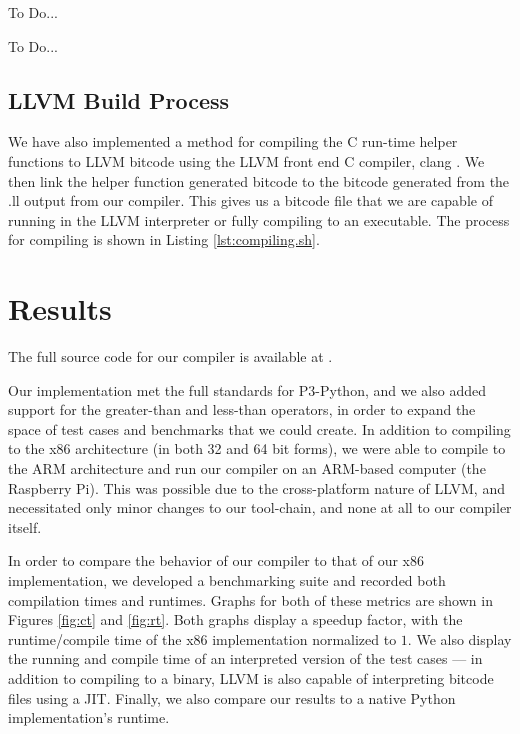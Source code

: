 \documentclass[11pt,twocolumn]{article}
\begin{document}



To Do...


To Do...

\subsection{LLVM Build Process}

We have also implemented a method for compiling the C run-time helper
functions to LLVM bitcode using the LLVM front end C compiler, clang
\cite{clang.llvm.org}. We then link the helper function generated
bitcode to the bitcode generated from the .ll output from our
compiler. This gives us a bitcode file that we are capable of running
in the LLVM interpreter or fully compiling to an executable.  The
process for compiling is shown in Listing \ref{lst:compiling.sh}.



\section{Results}

The full source code for our compiler is available at \cite{github-repo}.

Our implementation met the full standards for P3-Python, and we also
added support for the greater-than and less-than operators, in order
to expand the space of test cases and benchmarks that we could
create. In addition to compiling to the x86 architecture (in both 32
and 64 bit forms), we were able to compile to the ARM architecture and
run our compiler on an ARM-based computer (the Raspberry Pi). This was
possible due to the cross-platform nature of LLVM, and necessitated
only minor changes to our tool-chain, and none at all to our compiler
itself.

In order to compare the behavior of our compiler to that of our x86
implementation, we developed a benchmarking suite and recorded both
compilation times and runtimes. Graphs for both of these metrics are
shown in Figures \ref{fig:ct} and \ref{fig:rt}. Both graphs display a
speedup factor, with the runtime/compile time of the x86
implementation normalized to $1$. We also display the running and
compile time of an interpreted version of the test cases --- in
addition to compiling to a binary, LLVM is also capable of
interpreting bitcode files using a JIT. Finally, we also compare our
results to a native Python implementation's runtime.
\end{document}
